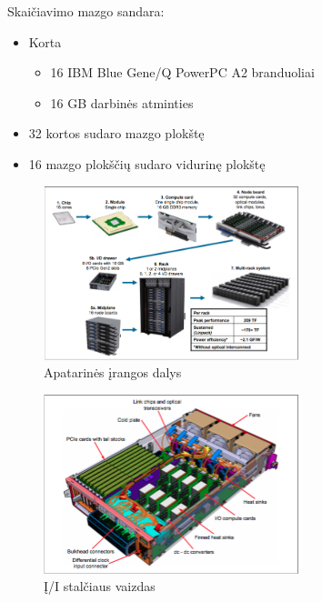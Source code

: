 \documentclass{beamer}
\begin{document}
    \begin{frame}
        Skaičiavimo mazgo sandara:
        \begin{itemize}
            \item Korta
            \begin{itemize}
                \item 16 IBM Blue Gene/Q PowerPC A2 branduoliai
                \item 16 GB darbinės atminties
            \end{itemize}
            \item 32 kortos sudaro mazgo plokštę
            \item 16 mazgo plokščių sudaro vidurinę plokštę
        \end{itemize}
    \end{frame}

    \begin{frame}
        \begin{figure}[H]
            \centering
            \includegraphics[width=280px]{img/rack-components.png}
            \caption{Apatarinės įrangos dalys \cite{milano2013ibm}}
        \end{figure}
    \end{frame}

    \begin{frame}
        \begin{figure}[H]
            \centering
            \includegraphics[width=280px]{img/internals.png}
            \caption{Į/I stalčiaus vaizdas \cite{milano2013ibm}}
        \end{figure}
    \end{frame}
\end{document}
